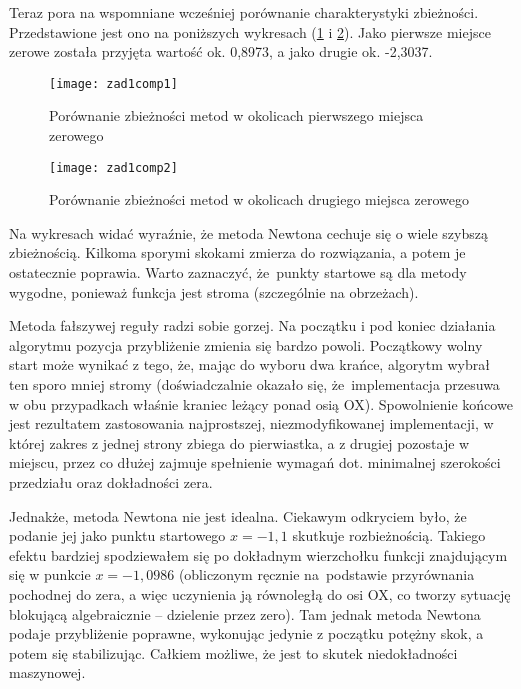 \documentclass[12pt]{article}
\begin{document}
Teraz pora na wspomniane wcześniej porównanie charakterystyki zbieżności. Przedstawione jest ono na poniższych wykresach (\ref{fig:zad1comp1} i \ref{fig:zad1comp2}). Jako pierwsze miejsce zerowe została przyjęta wartość ok. 0,8973, a jako drugie ok. -2,3037.

\begin{figure}[!htbp]
\centering
\texttt{[image: zad1comp1]}
\centering
\caption{Porównanie zbieżności metod w okolicach pierwszego miejsca zerowego}
\label{fig:zad1comp1}
\end{figure}
\FloatBarrier

\begin{figure}[!htbp]
\centering
\texttt{[image: zad1comp2]}
\centering
\caption{Porównanie zbieżności metod w okolicach drugiego miejsca zerowego}
\label{fig:zad1comp2}
\end{figure}
\FloatBarrier

Na wykresach widać wyraźnie, że metoda Newtona cechuje się o wiele szybszą zbieżnością. Kilkoma sporymi skokami zmierza do rozwiązania, a potem je ostatecznie poprawia. Warto zaznaczyć, że~punkty startowe są dla metody wygodne, ponieważ funkcja jest stroma (szczególnie na obrzeżach).

Metoda fałszywej reguły radzi sobie gorzej. Na początku i pod koniec działania algorytmu pozycja przybliżenie zmienia się bardzo powoli. Początkowy wolny start może wynikać z tego, że, mając do wyboru dwa krańce, algorytm wybrał ten sporo mniej stromy (doświadczalnie okazało się, że~implementacja przesuwa w obu przypadkach właśnie kraniec leżący ponad osią OX). Spowolnienie końcowe jest rezultatem zastosowania najprostszej, niezmodyfikowanej implementacji, w której zakres z jednej strony zbiega do pierwiastka, a z drugiej pozostaje w miejscu, przez co dłużej zajmuje spełnienie wymagań dot. minimalnej szerokości przedziału oraz dokładności zera.

Jednakże, metoda Newtona nie jest idealna. Ciekawym odkryciem było, że podanie jej jako punktu startowego \( x = -1,1 \) skutkuje rozbieżnością. Takiego efektu bardziej spodziewałem się po dokładnym wierzchołku funkcji znajdującym się w punkcie \( x = -1,0986 \) (obliczonym ręcznie na~podstawie przyrównania pochodnej do zera, a więc uczynienia ją równoległą do osi OX, co tworzy sytuację blokującą algebraicznie -- dzielenie przez zero). Tam jednak metoda Newtona podaje przybliżenie poprawne, wykonując jedynie z początku potężny skok, a potem się stabilizując. Całkiem możliwe, że jest to skutek niedokładności maszynowej.
\end{document}
